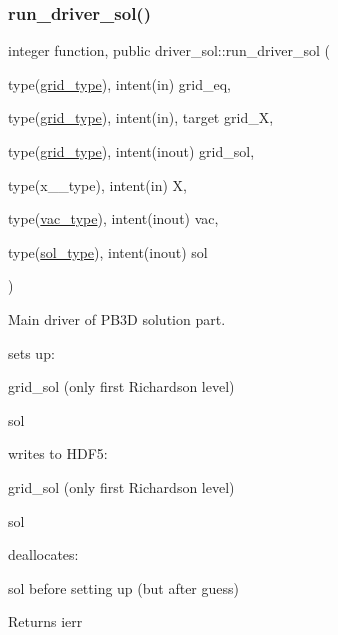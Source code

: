 \subsubsection{\texorpdfstring{run\+\_\+driver\+\_\+sol()}{run\_driver\_sol()}}
{\footnotesize\ttfamily integer function, public driver\+\_\+sol\+::run\+\_\+driver\+\_\+sol (\begin{DoxyParamCaption}\item[{type(\hyperlink{structgrid__vars_1_1grid__type}{grid\+\_\+type}), intent(in)}]{grid\+\_\+eq,  }\item[{type(\hyperlink{structgrid__vars_1_1grid__type}{grid\+\_\+type}), intent(in), target}]{grid\+\_\+X,  }\item[{type(\hyperlink{structgrid__vars_1_1grid__type}{grid\+\_\+type}), intent(inout)}]{grid\+\_\+sol,  }\item[{type(x\+\_\+2\+\_\+type), intent(in)}]{X,  }\item[{type(\hyperlink{structvac__vars_1_1vac__type}{vac\+\_\+type}), intent(inout)}]{vac,  }\item[{type(\hyperlink{structsol__vars_1_1sol__type}{sol\+\_\+type}), intent(inout)}]{sol }\end{DoxyParamCaption})}



Main driver of P\+B3D solution part. 


\begin{DoxyItemize}
\item sets up\+:
\begin{DoxyItemize}
\item {\ttfamily grid\+\_\+sol} (only first Richardson level)
\item {\ttfamily sol} 
\end{DoxyItemize}
\item writes to H\+D\+F5\+:
\begin{DoxyItemize}
\item {\ttfamily grid\+\_\+sol} (only first Richardson level)
\item {\ttfamily sol} 
\end{DoxyItemize}
\item deallocates\+:
\begin{DoxyItemize}
\item sol before setting up (but after guess)
\end{DoxyItemize}
\end{DoxyItemize}

\begin{DoxyReturn}{Returns}
ierr
\end{DoxyReturn}

